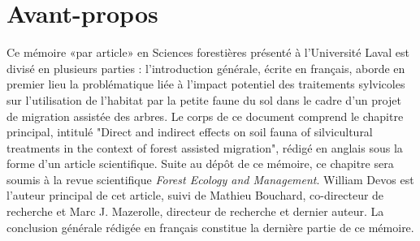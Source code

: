 \chapter*{Avant-propos}         %
\label{chap-avantpropos}        %


Ce mémoire «par article» en Sciences forestières présenté à l'Université Laval est divisé en plusieurs parties : 
l'introduction générale, écrite en français, aborde en premier lieu la problématique liée à l'impact potentiel des traitements sylvicoles sur 
l'utilisation de l'habitat par la petite faune du sol dans le cadre d'un projet de migration assistée des arbres.
Le corps de ce document comprend le chapitre principal, intitulé 
"Direct and indirect effects on soil fauna of silvicultural treatments in the context of forest assisted migration", rédigé en anglais sous la forme d'un article scientifique. 
Suite au dépôt de ce mémoire, ce chapitre sera soumis à la revue scientifique \textit{Forest Ecology and Management}. 
William Devos est l'auteur principal de cet article, suivi de Mathieu Bouchard, co-directeur de recherche et Marc J. Mazerolle, directeur de recherche et dernier auteur.
La conclusion générale rédigée en français constitue la dernière partie de ce mémoire.
